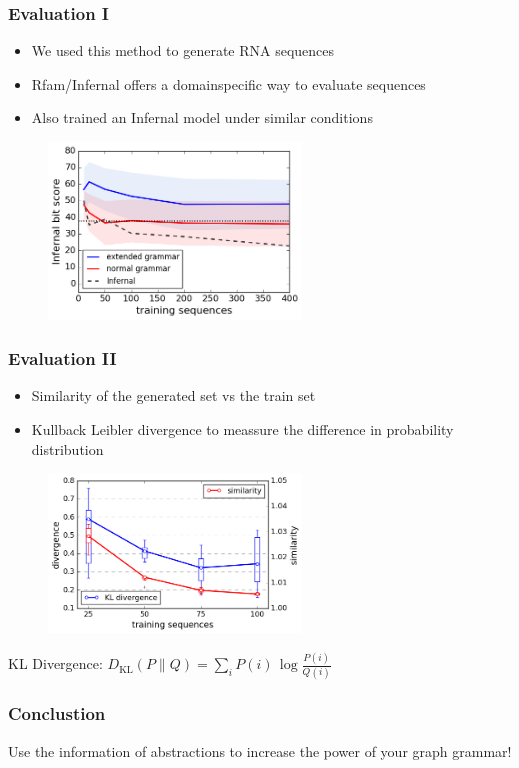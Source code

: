 \documentclass{beamer}
\begin{document}
\begin{frame}
    \frametitle{Evaluation I}
    \begin{itemize}
        \item We used this method to generate RNA sequences
        \item Rfam/Infernal offers a domainspecific way to evaluate sequences
        \item Also trained an Infernal model under similar conditions
    \end{itemize}

   \begin{figure}[ht]
        \centering
        \includegraphics[width=0.60\textwidth]{images/infernal_abstr.png}
    \end{figure}
\end{frame}

\begin{frame}
    \frametitle{Evaluation II}
    
    \begin{itemize}
        \item Similarity of the generated set vs the train set
        \item Kullback Leibler divergence to meassure the difference in probability distribution
    \end{itemize}
   \begin{figure}[ht]
        \centering
        \includegraphics[width=0.6\textwidth]{images/learningcurve.png}
    \end{figure}
    \tiny{KL Divergence:  $D_{\mathrm{KL}}(P\|Q) = \sum_i P(i) \, \log\frac{P(i)}{Q(i)}$ }
\end{frame}

\begin{frame}
    \frametitle{Conclustion}
        Use the information of abstractions
        to increase the power of your graph grammar!
\end{frame}
\end{document}
